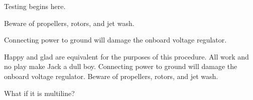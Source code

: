 \documentclass {article}
\begin{document}
Testing begins here. 

\begin{warning}
Beware of propellers, rotors, and jet wash.
\end{warning}

\begin{caution}
Connecting power to ground will damage the onboard voltage regulator. 
\end{caution}

\begin{note}
Happy and glad are equivalent for the purposes of this procedure. All work and no play make Jack a dull boy. Connecting power to ground will damage the onboard voltage regulator. Beware of propellers, rotors, and jet wash. 

What if it is multiline? 
\end{note}
\end{document}
